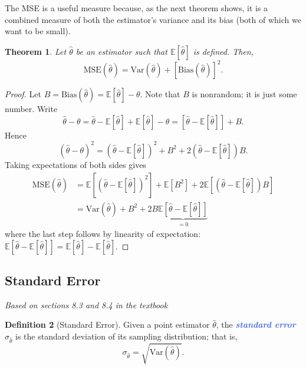 \documentclass[10pt]{article}
\newtheorem{theorem}{Theorem}
\theoremstyle{definition}
\newtheorem{definition}[theorem]{Definition}
\newcommand{\1}[1]{\textbf{1}_{\left[#1\right]}} %
\def\E{\mathbb{E}} %
\def\Var{\mathrm{Var}} %
\newcommand{\demph}[1]{\textcolor{RoyalBlue}{\textbf{\slshape #1}}} %
\begin{document}
The MSE is a useful measure because, as the next theorem shows, it is a
combined measure of both the estimator's variance and its bias (both of which
we want to be small).
\begin{theorem}
  Let $\widehat{\theta}$ be an estimator such that $\E[\widehat{\theta}]$ is defined. Then,
  \begin{equation*}
    \mathrm{MSE}(\widehat{\theta}) = \Var(\widehat{\theta}) + \left[ \mathrm{Bias}(\widehat{\theta}) \right]^{2}. 
  \end{equation*}
\end{theorem}
\begin{proof}
  Let $B = \text{Bias}(\widehat{\theta})= \E[\widehat{\theta}]-\theta$. Note that $B$ is nonrandom; it is just some number.
  Write
  \begin{equation*}
    \widehat{\theta}-\theta 
    = \widehat{\theta} - \E[\widehat{\theta}] + \E[\widehat{\theta}] -\theta 
    = \left[ \widehat{\theta}- \E[\widehat{\theta}] \right] + B.
  \end{equation*}
  Hence
  \begin{equation*}
    \left( \widehat{\theta}-\theta \right)^{2}  = \left( \widehat{\theta}- \E[\widehat{\theta}] \right)^{2} + B^{2} + 2 \left(\widehat{\theta}- \E[ \widehat{\theta}] \right)B.
  \end{equation*}
  Taking expectations of both sides gives
  \begin{align*}
    \mbox{MSE}(\widehat{\theta})
    &= \E\left[\left( \widehat{\theta}- \E[\widehat{\theta}] \right)^{2} \right] + \E\left[B^{2} \right] + 2 \E\left[\left(\widehat{\theta}- \E[ \widehat{\theta}] \right)B \right]\\
    &= \Var(\widehat{\theta})+ B^{2} +2B \underbrace{\E\left[\widehat{\theta}- \E[ \widehat{\theta}]  \right]}_{=0}
  \end{align*}
  where the last step follows by linearity of expectation:
  $\E\left[\widehat{\theta}- \E[ \widehat{\theta}] \right]= \E[\widehat{\theta} ]-
  \E[\widehat{\theta}]$.
\end{proof}

\subsection{Standard Error}
\textit{Based on sections 8.3 and 8.4 in the textbook}

\begin{definition}[Standard Error]
  \label{def:standard-error}
  Given a point estimator $\widehat{\theta}$, the \demph{standard error} $\sigma_{\widehat{\theta}}$ is
  the standard deviation of its sampling distribution; that is,
  \begin{equation*}
    \sigma_{\widehat{\theta}} = \sqrt{\Var(\widehat{\theta})}.
  \end{equation*}
\end{definition}
\end{document}
